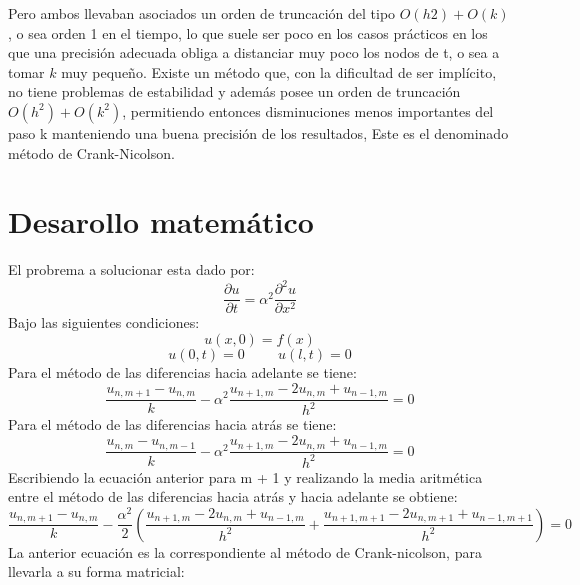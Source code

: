 \documentclass[11pt]{article} %
\begin{document}
Pero ambos llevaban asociados un orden de truncación del tipo $O(h2) + O(k)$, o sea orden 1 en el tiempo, lo que suele ser poco en los casos prácticos en los que una precisión adecuada obliga a distanciar muy poco los nodos de t, o sea a tomar $k$ muy pequeño. Existe un método que, con la dificultad de ser implícito, no tiene problemas de estabilidad y además posee un orden de truncación $O(h^2) + O(k^2)$, permitiendo entonces disminuciones menos importantes del paso k manteniendo una buena precisión de los resultados, Este es el denominado método de Crank-Nicolson.


\section*{Desarollo matemático}

El probrema a solucionar esta dado por:
$$\frac{\partial u}{\partial t}=\alpha^2\frac{\partial^2 u}{\partial x^2}$$
Bajo las siguientes condiciones:
$$u(x,0)=f(x)$$
$$u(0,t)=0\hspace{1cm}u(l,t)=0$$
Para el método de las diferencias hacia adelante se tiene:
$$\frac{u_{n,m+1}-u_{n,m}}{k}-\alpha^2\frac{u_{n+1,m}-2u_{n,m}+u_{n-1,m}}{h^2}=0$$
Para el método de las diferencias hacia atrás se tiene: 
$$\frac{u_{n,m}-u_{n,m-1}}{k}-\alpha^2\frac{u_{n+1,m}-2u_{n,m}+u_{n-1,m}}{h^2}=0$$
Escribiendo la ecuación anterior para m + 1 y realizando la media aritmética entre el método de las diferencias hacia atrás y hacia adelante se obtiene: 
$$\frac{u_{n,m+1}-u_{n,m}}{k}-\frac{\alpha^2}{2}(\frac{u_{n+1,m}-2u_{n,m}+u_{n-1,m}}{h^2}+\frac{u_{n+1,m+1}-2u_{n,m+1}+u_{n-1,m+1}}{h^2})=0$$
La anterior ecuación es la correspondiente al método de Crank-nicolson, para llevarla a su forma matricial:
\end{document}

